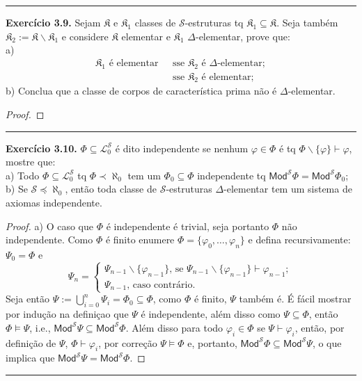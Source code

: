 \documentclass[11pt]{article}
\theoremstyle{definition}
\newcommand{\mc}[1]{\mathcal{#1}}
\newcommand{\mf}[1]{\mathfrak{#1}}
\newcommand{\msf}[1]{\mathsf{#1}}
\begin{document}
\hrule

\textbf{Exercício 3.9.} Sejam $\mf{K}$ e $\mf{K}_1$ classes de $\mc{S}$-estruturas tq $\mf{K}_1\subseteq\mf{K}$. Seja também $\mf{K}_2:=\mf{K}\backslash\mf{K}_1$ e considere $\mf{K}$ elementar e $\mf{K}_1$ $\Delta$-elementar, prove que:\\
a)
\begin{align*}
    \mf{K}_1\text{ é elementar }&\text{ sse }\mf{K}_2\text{ é }\Delta\text{-elementar};\\
    &\text{ sse }\mf{K}_2\text{ é elementar};
\end{align*}
b) Conclua que a classe de corpos de característica prima não é $\Delta$-elementar.

\begin{proof}
    
\end{proof}

\hrule

\textbf{Exercício 3.10.} $\Phi\subseteq\mc{L}^\mc{S}_0$ é dito independente se nenhum $\varphi\in\Phi$ é tq $\Phi\backslash\{\varphi\}\vdash\varphi$, mostre que:\\
a) Todo $\Phi\subseteq\mc{L}^\mc{S}_0$ tq $\Phi\prec\aleph_0$ tem um $\Phi_0\subseteq\Phi$ independente tq $\msf{Mod}^\mc{S}\Phi=\msf{Mod}^\mc{S}\Phi_0$;\\
b) Se $\mc{S}\preceq\aleph_0$, então toda classe de $\mc{S}$-estruturas $\Delta$-elementar tem um sistema de axiomas independente.

\begin{proof}
    a) O caso que $\Phi$ é independente é trivial, seja portanto $\Phi$ não independente. Como $\Phi$ é finito enumere $\Phi=\{\varphi_0,\dots,\varphi_n\}$ e defina recursivamente: $\Psi_0=\Phi$ e
    $$\Psi_n=
    \begin{cases}
        \Psi_{n-1}\backslash\{\varphi_{n-1}\}\text{, se }\Psi_{n-1}\backslash\{\varphi_{n-1}\}\vdash\varphi_{n-1};\\
        \Psi_{n-1}\text{, caso contrário}.
    \end{cases}$$
    Seja então $\Psi:=\bigcup_{i=0}^n\Psi_i=\Phi_0\subseteq\Phi$, como $\Phi$ é finito, $\Psi$ também é. É fácil mostrar por indução na definiçao que $\Psi$ é independente, além disso como $\Psi\subseteq\Phi$, então $\Phi\vDash\Psi$, i.e., $\msf{Mod}^\mc{S}\Psi\subseteq\msf{Mod}^\mc{S}\Phi$. Além disso para todo $\varphi_i\in\Phi$ se $\Psi\vdash\varphi_i$, então, por definição de $\Psi$, $\Phi\vdash\varphi_i$, por correção $\Psi\vDash\Phi$ e, portanto, $\msf{Mod}^\mc{S}\Phi\subseteq\msf{Mod}^\mc{S}\Psi$, o que implica que $\msf{Mod}^\mc{S}\Psi=\msf{Mod}^\mc{S}\Phi$.
\end{proof}
\hrule
\end{document}
